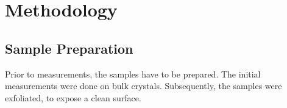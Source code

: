 \documentclass[
	twoside,
	parskip=half,
	a4paper,
]{scrbook}
\begin{document}



\chapter{Methodology}
\section{Sample Preparation}
Prior to measurements, the samples have to be prepared.
The initial measurements were done on bulk crystals.
Subsequently, the samples were exfoliated, to expose a clean surface.
\end{document}
